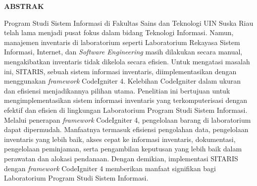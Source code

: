 %


%
\fontsize{12}{14.4}
\begin{center}\MakeUppercase{\textbf{Abstrak}}\end{center}

\noindent
\fontsize{10pt}{12pt}\selectfont
Program Studi Sistem Informasi di Fakultas Sains dan Teknologi UIN Suska Riau telah lama menjadi pusat fokus dalam bidang Teknologi Informasi. Namun, manajemen inventaris di laboratorium seperti Laboratorium Rekayasa Sistem Informasi, Internet, dan \textit{Software Engineering} masih dilakukan secara manual, mengakibatkan inventaris tidak dikelola secara efisien. Untuk mengatasi masalah ini, SITARIS, sebuah sistem informasi inventaris, diimplementasikan dengan menggunakan \textit{framework} CodeIgniter 4. Kelebihan CodeIgniter dalam ukuran dan efisiensi menjadikannya pilihan utama. Penelitian ini bertujuan untuk mengimplementasikan sistem informasi inventaris yang terkomputerisasi dengan efektif dan efisien di lingkungan Laboratorium Program Studi Sistem Informasi. Melalui penerapan \textit{framework} CodeIgniter 4, pengelolaan barang di laboratorium dapat dipermudah. Manfaatnya termasuk efisiensi pengolahan data, pengelolaan inventaris yang lebih baik, akses cepat ke informasi inventaris, dokumentasi, pengelolaan peminjaman, serta pengambilan keputusan yang lebih baik dalam perawatan dan alokasi pendanaan. Dengan demikian, implementasi SITARIS dengan \textit{framework} CodeIgniter 4 memberikan manfaat signifikan bagi Laboratorium Program Studi Sistem Informasi.\\
 \\